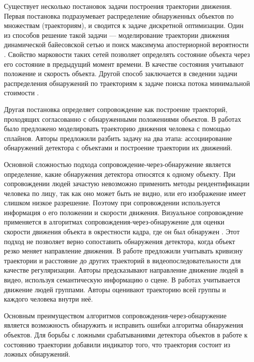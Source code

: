 Существует несколько постановок задачи построения траектории движения. Первая постановка подразумевает распределение обнаруженных объектов по множествам (траекториям), и сводится к задаче дискретной оптимизации. Один из способов решение такой задачи --- моделирование траектории движения динамической байесовской сетью и поиск максимума апостериорной вероятности \cite{yoon2012visual,benfold2011stable,izadinia20122t,choi2012unified}. Свойство марковости таких сетей позволяет определять состояние объекта через его состояние в предыдущий момент времени. В качестве состояния учитывают положение и скорость объекта. Другой способ заключается в сведении задачи распределения обнаружений по траекториям к задаче поиска потока минимальной стоимости \cite{leal2011everybody,butt2013multi}.

Другая постановка определяет сопровождение как построение траекторий, проходящих согласованно с обнаруженными положениями объектов. В работах \cite{andriyenko2012discrete,milan2013detection} было предложено моделировать траекторию движения человека с помощью сплайнов. Авторы предложили разбить задачу на два этапа: ассоциирование обнаружений детектора с объектами и построение траектории их движений.

Основной сложностью подхода сопровождение-через-обнаружение является определение, какие обнаружения детектора относятся к одному объекту. При сопровождении людей зачастую невозможно применить методы реидентификации человека по лицу, так как оно может быть не видно, или его изображение имеет слишком низкое разрешение. Поэтому при сопровождении используется информация о его положении и скорости движения. Визуальное сопровождение применяется в алгоритмах сопровождения-через-обнаружение для оценки скорости движения объекта в окрестности кадра, где он был обнаружен \cite{benfold2011stable,izadinia20122t}. Этот подход не позволяет верно сопоставить обнаружения детектора, когда объект резко меняет направление движения. В работе \cite{milan2013detection} предложили учитывать кривизну траектории и расстояние до других траекторий в видеопоследовательности для качестве регуляризации. Авторы \cite{gong2011multi} предсказывают направление движение людей в видео, используя семантическую информацию о сцене. В работах \cite{leal2011everybody,choi2012unified} учитывается движение людей группами. Авторы оценивают траекторию всей группы и каждого человека внутри неё.

Основным преимуществом алгоритмов сопровождения-через-обнаружение является возможность обнаружить и исправить ошибки алгоритма обнаружения объектов. Для борьбы с ложными срабатываниями детектора объектов в работе \cite{benfold2011stable} к состоянию траектории добавили индикатор того, что траектория состоит из ложных обнаружений. 

